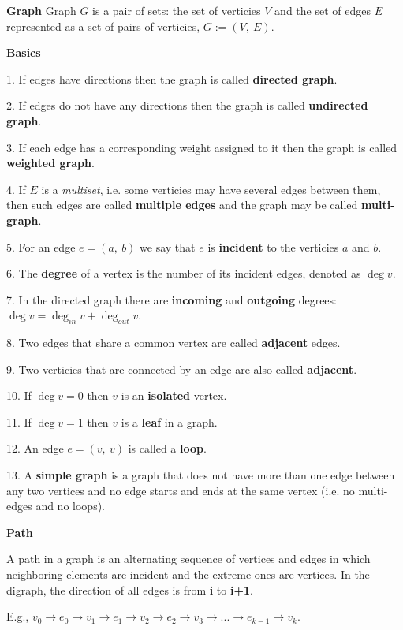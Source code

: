 
\begin{definition}\textbf{Graph}
    Graph $G$ is a pair of sets: the set of verticies $V$ and the set of edges $E$ represented as a set of pairs of verticies, $G := (V,\ E)$.
\end{definition}

\begin{definition}\textbf{Basics}

    1. If edges have directions then the graph is called \textbf{directed graph}.

    2. If edges do not have any directions then the graph is called \textbf{undirected graph}.

    3. If each edge has a corresponding weight assigned to it then the graph is called \textbf{weighted graph}.

    4. If $E$ is a \textit{multiset}, i.e. some verticies may have several edges between them, then such edges are called \textbf{multiple edges} and the graph may be called \textbf{multi-graph}.

    5. For an edge $e = (a,\ b)$ we say that $e$ is \textbf{incident} to the verticies $a$ and $b$.

    6. The \textbf{degree} of a vertex is the number of its incident edges, denoted as $\deg{v}$.

    7. In the directed graph there are \textbf{incoming} and \textbf{outgoing} degrees: $\deg{v} = \deg_{in}{v} + \deg_{out}{v}$.

    8. Two edges that share a common vertex are called \textbf{adjacent} edges.

    9. Two verticies that are connected by an edge are also called \textbf{adjacent}.

    10. If $\deg{v} = 0$ then $v$ is an \textbf{isolated} vertex.

    11. If $\deg{v} = 1$ then $v$ is a \textbf{leaf} in a graph.

    12. An edge $e = (v,\ v)$ is called a \textbf{loop}.

    13. A \textbf{simple graph} is a graph that does not have more than one edge between any two vertices and no edge starts and ends at the same vertex (i.e. no multi-edges and no loops).

\end{definition}

\begin{definition}\textbf{Path}

    A path in a graph is an alternating sequence of vertices and edges in which neighboring elements are incident and the extreme ones are vertices. In the digraph, the direction of all edges is from \textbf{i} to \textbf{i+1}.

    E.g., $v_0 \to e_0 \to v_1 \to e_1 \to v_2 \to e_2 \to v_3 \to ... \to e_{k-1} \to v_k$.

\end{definition}

